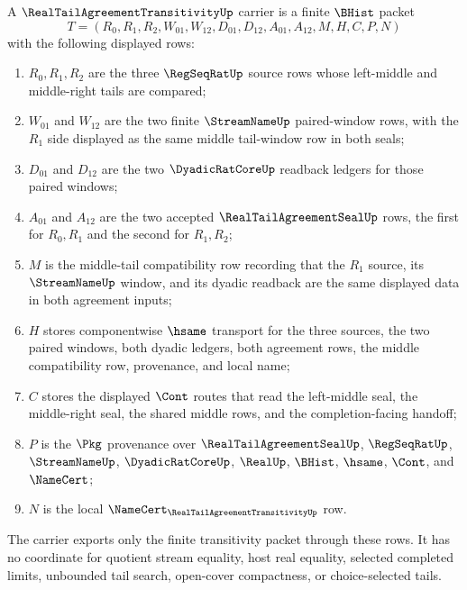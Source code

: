 \begin{definition}
\label{def:real-tail-agreement-transitivity-carrier}
A $\RealTailAgreementTransitivityUp$ carrier is a finite $\BHist$ packet
$$
T=(R_0,R_1,R_2,W_{01},W_{12},D_{01},D_{12},A_{01},A_{12},M,H,C,P,N)
$$
with the following displayed rows:
\begin{enumerate}
\item $R_0,R_1,R_2$ are the three $\RegSeqRatUp$ source rows whose left-middle and middle-right tails are compared;
\item $W_{01}$ and $W_{12}$ are the two finite $\StreamNameUp$ paired-window rows, with the $R_1$ side displayed as the same middle tail-window row in both seals;
\item $D_{01}$ and $D_{12}$ are the two $\DyadicRatCoreUp$ readback ledgers for those paired windows;
\item $A_{01}$ and $A_{12}$ are the two accepted $\RealTailAgreementSealUp$ rows, the first for $R_0,R_1$ and the second for $R_1,R_2$;
\item $M$ is the middle-tail compatibility row recording that the $R_1$ source, its $\StreamNameUp$ window, and its dyadic readback are the same displayed data in both agreement inputs;
\item $H$ stores componentwise $\hsame$ transport for the three sources, the two paired windows, both dyadic ledgers, both agreement rows, the middle compatibility row, provenance, and local name;
\item $C$ stores the displayed $\Cont$ routes that read the left-middle seal, the middle-right seal, the shared middle rows, and the completion-facing handoff;
\item $P$ is the $\Pkg$ provenance over $\RealTailAgreementSealUp$, $\RegSeqRatUp$, $\StreamNameUp$, $\DyadicRatCoreUp$, $\RealUp$, $\BHist$, $\hsame$, $\Cont$, and $\NameCert$;
\item $N$ is the local $\NameCert_{\RealTailAgreementTransitivityUp}$ row.
\end{enumerate}
The carrier exports only the finite transitivity packet through these rows. It has no coordinate for quotient stream equality, host real equality, selected completed limits, unbounded tail search, open-cover compactness, or choice-selected tails.
\end{definition}

